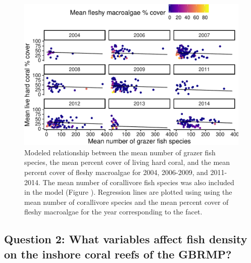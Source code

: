 \documentclass[12pt,]{article}
\begin{document}
\begin{figure}

\includegraphics{Mullaney_ENV872_Project_files/figure-latex/Coral Percent Cover Plot (Grazers)-1} \hfill{}

\caption{Modeled relationship between the mean number of grazer fish species, the mean percent cover of living hard coral, and the mean percent cover of fleshy macroalgae for 2004, 2006-2009, and 2011-2014. The mean number of corallivore fish species was also included in the model (Figure ). Regression lines are plotted using using the mean number of corallivore species and the mean percent cover of fleshy macroalgae for the year corresponding to the facet.}\label{fig:Coral Percent Cover Plot (Grazers)}
\end{figure}

\hypertarget{question-2-what-variables-affect-fish-density-on-the-inshore-coral-reefs-of-the-gbrmp}{%
\subsection{Question 2: What variables affect fish density on the
inshore coral reefs of the
GBRMP?}\label{question-2-what-variables-affect-fish-density-on-the-inshore-coral-reefs-of-the-gbrmp}}
\end{document}
